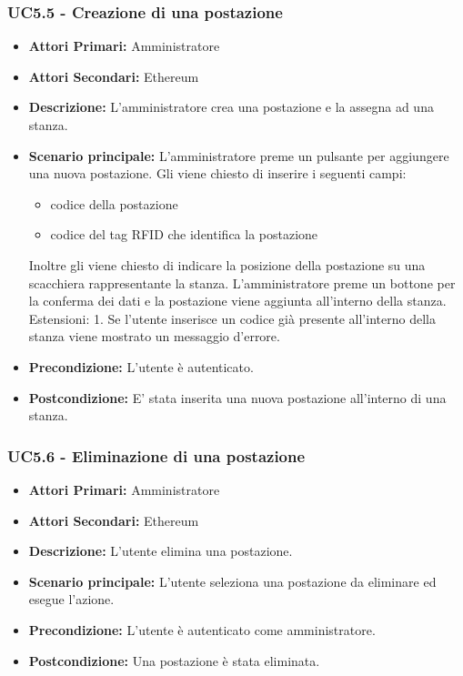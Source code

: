 \subsubsection{ UC5.5 - Creazione di una postazione}
\begin{itemize}
	\item\textbf{Attori Primari:}
	Amministratore 
	\item\textbf{Attori Secondari:}
	Ethereum
	\item\textbf{Descrizione:}
	L'amministratore crea una postazione e la assegna ad una stanza.
	\item\textbf{Scenario principale:} 
	L'amministratore preme un pulsante per aggiungere una nuova postazione. Gli viene chiesto di inserire i seguenti campi:
	\begin{itemize}
		\item{codice della postazione}
		\item{codice del tag RFID che identifica la postazione}
	\end{itemize}
	Inoltre gli viene chiesto di indicare la posizione della postazione su una scacchiera rappresentante la stanza.
	L'amministratore preme un bottone per la conferma dei dati e la postazione viene aggiunta all'interno della stanza.
	Estensioni:
	1. Se l'utente inserisce un codice già presente all'interno della stanza viene mostrato un messaggio d'errore.
	\item\textbf{Precondizione:} 
	L'utente è autenticato.
	\item\textbf{Postcondizione:}
	E' stata inserita una nuova postazione all'interno di una stanza.
\end{itemize}

\subsubsection{ UC5.6 - Eliminazione di una postazione}
\begin{itemize}
	\item\textbf{Attori Primari:}
	Amministratore 
	\item\textbf{Attori Secondari:}
	Ethereum
	\item\textbf{Descrizione:}
	L'utente elimina una postazione.
	\item\textbf{Scenario principale:} 
	L'utente seleziona una postazione da eliminare ed esegue l'azione.
	\item\textbf{Precondizione:} 
	L'utente è autenticato come amministratore.
	\item\textbf{Postcondizione:}
	Una postazione è stata eliminata.
\end{itemize}


